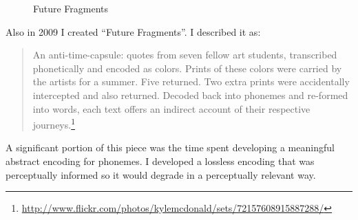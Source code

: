 \documentclass{thesis}
\begin{document}
\begin{figure}
  \begin{center}
	  \caption{Future Fragments}
	  \label{future-fragments}
  \end{center}
\end{figure}

Also in 2009 I created ``Future Fragments''. I described it as:
	
	\begin{quote}
	An anti-time-capsule: quotes from seven fellow art students, transcribed phonetically and encoded as colors. Prints of these colors were carried by the artists for a summer. Five returned. Two extra prints were accidentally intercepted and also returned. Decoded back into phonemes and re-formed into words, each text offers an indirect account of their respective journeys.\footnote{\url{http://www.flickr.com/photos/kylemcdonald/sets/72157608915887288/}}
	\end{quote}

A significant portion of this piece was the time spent developing a meaningful abstract encoding for phonemes. I developed a lossless encoding that was perceptually informed so it would degrade in a perceptually relevant way.
\end{document}
